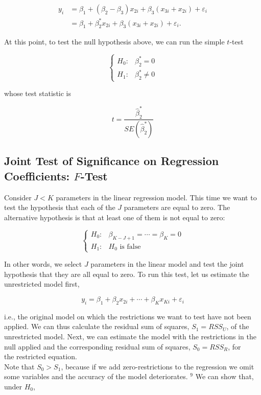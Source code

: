 $$
\begin{aligned}
y_{i} & =\beta_{1}+\left(\beta_{2}-\beta_{3}\right) x_{2 i}+\beta_{3}\left(x_{3 i}+x_{2 i}\right)+\varepsilon_{i} \\
& =\beta_{1}+\beta_{2}^{*} x_{2 i}+\beta_{3}\left(x_{3 i}+x_{2 i}\right)+\varepsilon_{i} .
\end{aligned}
$$

At this point, to test the null hypothesis above, we can run the simple $t$-test

$$
\begin{cases}H_{0}: & \beta_{2}^{*}=0 \\ H_{1}: & \beta_{2}^{*} \neq 0\end{cases}
$$

whose test statistic is

$$
t=\frac{\widehat{\beta}_{2}^{*}}{S E\left(\widehat{\beta}_{2}^{*}\right)}
$$

\subsection{Joint Test of Significance on Regression Coefficients: $F$-Test}
Consider $J<K$ parameters in the linear regression model. This time we want to test the hypothesis that each of the $J$ parameters are equal to zero. The alternative hypothesis is that at least one of them is not equal to zero:

$$
\begin{cases}H_{0}: & \beta_{K-J+1}=\cdots=\beta_{K}=0 \\ H_{1}: & H_{0} \text { is false }\end{cases}
$$

In other words, we select $J$ parameters in the linear model and test the joint hypothesis that they are all equal to zero. To run this test, let us estimate the unrestricted model first,

$$
y_{i}=\beta_{1}+\beta_{2} x_{2 i}+\cdots+\beta_{K} x_{K i}+\varepsilon_{i}
$$

i.e., the original model on which the restrictions we want to test have not been applied. We can thus calculate the residual sum of squares, $S_{1}=R S S_{U}$, of the unrestricted model. Next, we can estimate the model with the restrictions in the null applied and the corresponding residual sum of squares, $S_{0}=R S S_{R}$, for\\
the restricted equation.\\
Note that $S_{0}>S_{1}$, because if we add zero-restrictions to the regression we omit some variables and the accuracy of the model deteriorates. ${ }^{9}$ We can show that, under $H_{0}$,

